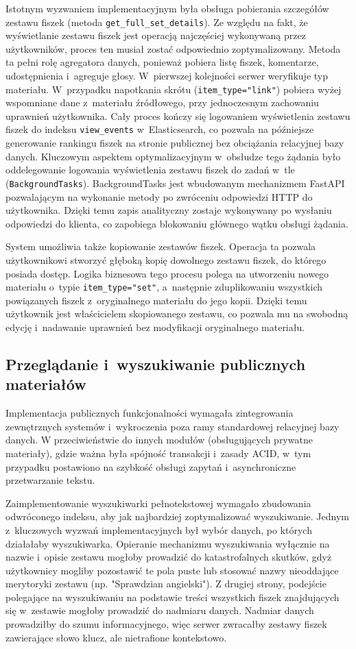 Istotnym wyzwaniem implementacyjnym była obsługa pobierania szczegółów zestawu fiszek (metoda \texttt{get\_full\_set\_details}).
Ze względu na fakt, że wyświetlanie zestawu fiszek jest operacją najczęściej wykonywaną przez użytkowników, proces ten musiał zostać odpowiednio zoptymalizowany. 
Metoda ta pełni rolę agregatora danych, ponieważ pobiera listę fiszek, komentarze, udostępnienia i~agreguje głosy. W~pierwszej kolejności serwer 
weryfikuje typ materiału. W~przypadku napotkania skrótu (\texttt{item\_type="link"}) pobiera wyżej wspomniane dane z~materiału źródłowego, przy 
jednoczesnym zachowaniu uprawnień użytkownika. Cały proces kończy się logowaniem wyświetlenia zestawu fiszek do indeksu 
\texttt{view\_events} w~Elasticsearch, co pozwala na późniejsze generowanie rankingu fiszek na stronie publicznej bez obciążania relacyjnej bazy danych.
Kluczowym aspektem optymalizacyjnym w~obsłudze tego żądania było oddelegowanie logowania wyświetlenia zestawu fiszek do zadań w~tle (\texttt{BackgroundTasks}).
BackgroundTasks jest wbudowanym mechanizmem FastAPI pozwalającym na wykonanie metody po zwróceniu odpowiedzi HTTP do użytkownika.
Dzięki temu zapis analityczny zostaje wykonywany po wysłaniu odpowiedzi do klienta, co zapobiega blokowaniu głównego wątku obsługi żądania.

System umożliwia także kopiowanie zestawów fiszek. Operacja ta pozwala użytkownikowi stworzyć głęboką kopię dowolnego zestawu fiszek, do którego 
posiada dostęp. Logika biznesowa tego procesu polega na utworzeniu nowego materiału o~typie \texttt{item\_type="set"}, a~następnie zduplikowaniu wszystkich 
powiązanych fiszek z~oryginalnego materiału do jego kopii. Dzięki temu użytkownik jest właścicielem skopiowanego zestawu, co pozwala mu na swobodną edycję i~nadawanie 
uprawnień bez modyfikacji oryginalnego materiału.

\subsection{Przeglądanie i~wyszukiwanie publicznych materiałów}
Implementacja publicznych funkcjonalności wymagała zintegrowania zewnętrznych systemów i~wykroczenia poza ramy standardowej relacyjnej bazy danych. 
W przeciwieństwie do innych modułów (obsługujących prywatne materiały), gdzie ważna była spójność transakcji i~zasady ACID, w~tym przypadku postawiono 
na szybkość obsługi zapytań i~asynchroniczne przetwarzanie tekstu.

Zaimplementowanie wyszukiwarki pełnotekstowej wymagało zbudowania odwróconego indeksu, aby jak najbardziej zoptymalizować wyszukiwanie. Jednym z~kluczowych 
wyzwań implementacyjnych był wybór danych, po których działałaby wyszukiwarka. Opieranie mechanizmu wyszukiwania wyłącznie na nazwie i~opisie zestawu mogłoby 
prowadzić do katastrofalnych skutków, gdyż użytkownicy mogliby pozostawić te pola puste lub stosować nazwy nieoddające merytoryki zestawu (np. "Sprawdzian angielski").
Z drugiej strony, podejście polegające na wyszukiwaniu na podstawie treści wszystkich fiszek znajdujących się w~zestawie mogłoby prowadzić do nadmiaru danych. Nadmiar 
danych prowadziłby do szumu informacyjnego, więc serwer zwracałby zestawy fiszek zawierające słowo klucz, ale nietrafione kontekstowo.

